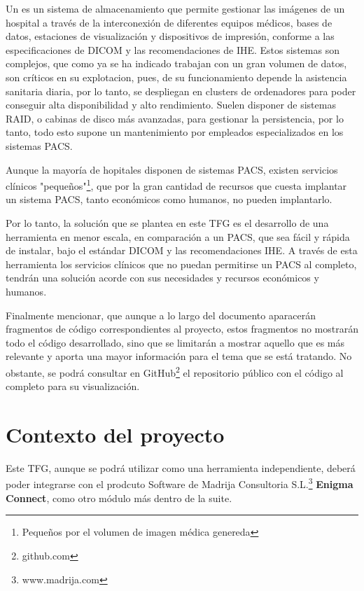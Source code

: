 Un \textbf{} es un sistema de almacenamiento que permite gestionar las imágenes de un hospital a través de la interconexión de diferentes equipos médicos, bases de datos, estaciones de visualización y dispositivos de impresión, conforme a las especificaciones de \acs{DICOM} y las recomendaciones de \acs{IHE}. Estos sistemas son complejos, que como ya se ha indicado trabajan con un gran volumen de datos, son críticos en su explotacion, pues, de su funcionamiento depende la asistencia sanitaria diaria, por lo tanto, se despliegan en clusters de ordenadores para poder conseguir alta disponibilidad y alto rendimiento. Suelen disponer de sistemas RAID, o cabinas de disco más avanzadas, para gestionar la persistencia, por lo tanto, todo esto supone un mantenimiento por empleados especializados en los sistemas \acs{PACS}.

Aunque la mayoría de hopitales disponen de sistemas \acs{PACS}, existen servicios clínicos "pequeños"\footnote{Pequeños por el volumen de imagen médica genereda}, que por la gran cantidad de recursos que cuesta implantar un sistema \acs{PACS}, tanto económicos como humanos, no pueden implantarlo.

Por lo tanto, la solución que se plantea en este \acs{TFG} es el desarrollo de una herramienta en menor escala, en comparación a un \acs{PACS}, que sea fácil y rápida de instalar, bajo el estándar \acs{DICOM} y las recomendaciones \acs{IHE}. A través de esta herramienta los servicios clínicos que no puedan permitirse un \acs{PACS} al completo, tendrán una solución acorde con sus necesidades y recursos económicos y humanos.

Finalmente mencionar, que aunque a lo largo del documento aparacerán fragmentos de código correspondientes al proyecto, estos fragmentos no mostrarán todo el código  desarrollado, sino que se limitarán a mostrar aquello que es más relevante y aporta una mayor información para el tema que se está tratando. No obstante, se podrá consultar en GitHub\footnote{github.com} el repositorio público con el código al completo para su visualización.


\section{Contexto del proyecto}
Este \acs{TFG}, aunque se podrá utilizar como una herramienta independiente, deberá poder integrarse con el prodcuto Software de Madrija Consultoria S.L.\footnote{www.madrija.com} \textbf{Enigma Connect}, como otro módulo más dentro de la suite.


